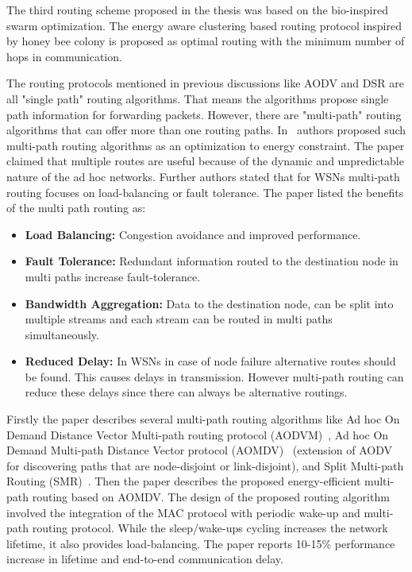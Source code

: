 \documentclass[12pt, oneandhalf, chaparabic, sees, ms]{metu}
\begin{document}
\newpage
The third routing scheme proposed in the thesis was based on the bio-inspired swarm optimization. 
The energy aware clustering based routing protocol inspired by honey bee colony is proposed as
optimal routing with the minimum number of hops in communication.



The routing protocols mentioned in previous discussions like AODV and DSR are all
"single path" routing algorithms. That means the algorithms propose single path
information for forwarding packets. However, there are "multi-path" routing algorithms 
that can offer more than one routing paths. In~\cite{hurni2008} authors proposed such multi-path
routing algorithms as an optimization to energy constraint.
The paper claimed that multiple routes are useful because of the dynamic and unpredictable
nature of the ad hoc networks. Further authors stated that for WSNs multi-path routing focuses
on load-balancing or fault tolerance.
The paper listed the benefits of the multi path routing as:
\vspace{-0.5cm}
\begin{itemize}
\setlength\itemsep{0em}
\item \textbf{Load Balancing:} Congestion avoidance and improved performance.
\item \textbf{Fault Tolerance:} Redundant information routed to the destination node in multi paths increase fault-tolerance.
\item \textbf{Bandwidth Aggregation:} Data to the destination node, can be split into multiple streams and each stream can be routed 
in multi paths simultaneously.
\item \textbf{Reduced Delay:} In WSNs in case of node failure alternative routes should be found. This causes delays in transmission.
However multi-path routing can reduce these delays since there can always be alternative routings.
\end{itemize}
\vspace{-0.5cm}
Firstly the paper describes several multi-path routing algorithms like Ad hoc On
Demand Distance Vector Multi-path routing protocol (AODVM)~\cite{ye2003}, Ad hoc On Demand Multi-path Distance
Vector protocol (AOMDV)~\cite{marina2001} (extension of AODV for discovering paths that are node-disjoint or link-disjoint),
and Split Multi-path Routing (SMR)~\cite{lee2001}. Then the paper describes the proposed energy-efficient multi-path routing based on AOMDV.
The design of the proposed routing algorithm involved the integration of the MAC protocol with periodic wake-up and multi-path routing protocol.
While the sleep/wake-ups cycling increases the network lifetime, it also provides load-balancing. The paper reports 10-15\% performance
increase in lifetime and end-to-end communication delay.
\end{document}
